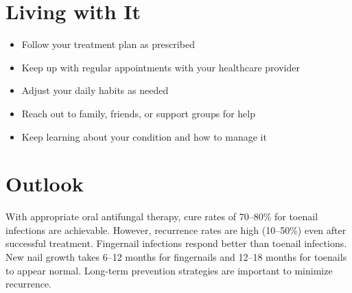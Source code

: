\section{Living with It}

\begin{itemize}[noitemsep]
  \item Follow your treatment plan as prescribed
  \item Keep up with regular appointments with your healthcare provider
  \item Adjust your daily habits as needed
  \item Reach out to family, friends, or support groups for help
  \item Keep learning about your condition and how to manage it
\end{itemize}

\section{Outlook}
With appropriate oral antifungal therapy, cure rates of 70--80\% for toenail infections are achievable. However, recurrence rates are high (10--50\%) even after successful treatment. Fingernail infections respond better than toenail infections. New nail growth takes 6--12 months for fingernails and 12--18 months for toenails to appear normal. Long-term prevention strategies are important to minimize recurrence.
